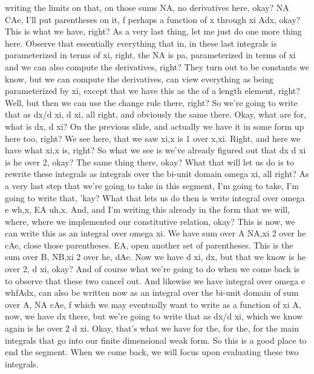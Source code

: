 \documentclass[10pt]{article}
\begin{document}
writing the limits on that, on those sums NA, no derivatives here, okay? NA CAe, I'll put parentheses on it, f perhaps a function of x through xi Adx, okay? This is what we have, right? As a very last thing, let me just do one more thing here. Observe that essentially everything that in, in these last integrals is parameterized in terms of xi, right, the NA is pa, parameterized in terms of xi and we can also compute the derivatives, right? They turn out to be constants we know, but we can compute the derivatives, can view everything as being parameterized by xi, except that we have this as the of a length element, right? Well, but then we can use the change rule there, right? So we're going to write that as dx/d xi, d xi, all right, and obviously the same there. Okay, what are for, what is dx, d xi? On the previous slide, and actually we have it in some form up here too, right? We see here, that we saw xi,x is 1 over x,xi. Right, and here we have what xi,x is, right? So what we see is we've already figured out that dx d xi is he over 2, okay? The same thing there, okay? What that will let us do is to rewrite these integrals as integrals over the bi-unit domain omega xi, all right? As a very last step that we're going to take in this segment, I'm going to take, I'm going to write that, 'kay? What that lets us do then is write integral over omega e wh,x, EA uh,x. And, and I'm writing this already in the form that we will, where, where we implemented our constitutive relation, okay? This is now, we can write this as an integral over omega xi. We have sum over A NA,xi 2 over he cAe, close those parentheses. EA, open another set of parentheses. This is the sum over B, NB,xi 2 over he, dAe. Now we have d xi, dx, but that we know is he over 2, d xi, okay? And of course what we're going to do when we come back is to observe that these two cancel out. And likewise we have integral over omega e whfAdx, can also be written now as an integral over the bi-unit domain of sum over A, NA cAe, f which we may eventually want to write as a function of xi A, now, we have dx there, but we're going to write that as dx/d xi, which we know again is he over 2 d xi. Okay, that's what we have for the, for the, for the main integrals that go into our finite dimensional weak form. So this is a good place to end the segment. When we come back, we will focus upon evaluating these two integrals.
\end{document}
